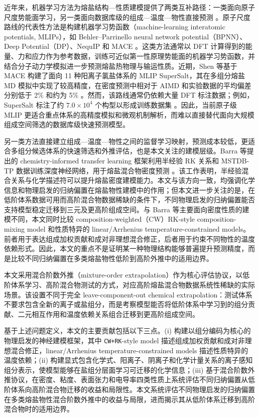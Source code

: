 \documentclass[journal=jctcce,manuscript=article,doi=true]{achemso}
\providecommand{\passthrough}[1]{#1}
\begin{document}
近年来，机器学习方法为熔盐结构---性质建模提供了两类互补路径：一类面向原子尺度势能面学习，另一类面向数据库级的组成---温度---物性直接预测 \cite{porter2022computational,ravichandran2024eutectics}。原子尺度路线的代表性方法是构建机器学习势函数（machine-learning interatomic potentials, MLIPs），如 Behler--Parrinello neural network potential（BPNN）、Deep Potential（DP）\cite{behler2007generalized,zhang2018deep}、NequIP \cite{batzner2022e3} 和 MACE \cite{batatia2022mace}。这类方法通常以 DFT 计算得到的能量、力和应力作为参考数据，训练可近似第一性原理势能面的机器学习势函数，并结合分子动力学模拟进一步预测熔盐热物理与输运性质。近期，Shen 等基于 MACE 构建了面向 11 种阳离子氯盐体系的 MLIP SuperSalt，其在多组分熔盐 MD 模拟中实现了较高精度，在密度预测中相对于 AIMD 和实验数据的平均偏差分别低于 2\% 和约为 5\% \cite{shen2025supersalt}。然而，该路线通常仍依赖大量 DFT 标注数据；例如，SuperSalt 标注了约 \(7.0 \times 10^4\) 个构型以形成训练数据集 \cite{shen2025supersalt}。因此，当前原子级 MLIP 更适合重点体系的高精度模拟和微观机制解析，而难以直接替代面向大规模组成空间筛选的数据库级快速预测模型。

另一类方法直接建立组成---温度---物性之间的监督学习映射，预测成本较低，更适合多组分候选体系的快速筛选和外推评估，也是本文关注的建模层级。Barra 等提出的 chemistry-informed transfer learning 框架利用半经验 RK 关系和 MSTDB-TP 数据训练深度神经网络，用于熔盐混合物密度预测 \cite{barra2025generalizable}。该工作表明，半经验混合关系与化学描述符可以提升熔盐密度建模能力。本文与该方向一致，均强调化学信息和物理启发的归纳偏置在熔盐物性建模中的作用；但本文进一步关注的是，在低阶体系数据可用而高阶混合物数据稀缺的条件下，不同物理启发的归纳偏置能否支持模型稳定迁移到三元及更高阶组成空间。与 Barra 等主要面向密度性质的建模不同，本文同时比较 composition-weighted（CW）RK-style composition-mixing model 和性质特异的 linear/Arrhenius temperature-constrained models。前者用于表达组成加权贡献和成对非理想混合修正，后者用于约束不同物性的温度依赖形式。因此，本文的重点不是证明某一种物理结构能够普遍提升预测精度，而是比较不同归纳偏置在多类熔盐物性低阶到高阶外推中的适用边界。

本文采用混合阶数外推（mixture-order extrapolation）作为核心评估协议，以低阶体系学习、高阶混合物测试的方式，对应高阶熔盐混合物数据系统性稀缺的实际场景。该设置不同于完全 leave-component-out chemical extrapolation：测试体系不要求包含全新的离子或盐组分，而是考察模型能否将低阶体系中学习到的组分贡献、二元相互作用和温度依赖关系组合迁移到更高阶组成空间。

基于上述问题定义，本文的主要贡献包括以下三点。(i) 构建以组分编码为核心的物理启发的神经建模框架，其中 \passthrough{\lstinline!CW+RK!}-style model 描述组成加权贡献和成对非理想混合修正，linear/Arrhenius temperature-constrained models 描述性质特异的温度依赖；(ii) 构建显式包含化学式、阳离子、阴离子和化学计量关系的离子感知组分表示，使模型能够在盐组分层面学习可迁移的化学信息；(iii) 基于混合阶数外推协议，在密度、粘度、表面张力和电导率四类性质上系统评估不同归纳偏置从低阶体系向高阶混合物迁移的收益和局限性。本文系统评估不同物理启发的归纳偏置在多类熔盐物性混合阶数外推中的收益与局限，进而揭示其从低阶体系迁移到高阶混合物时的适用边界。
\end{document}
